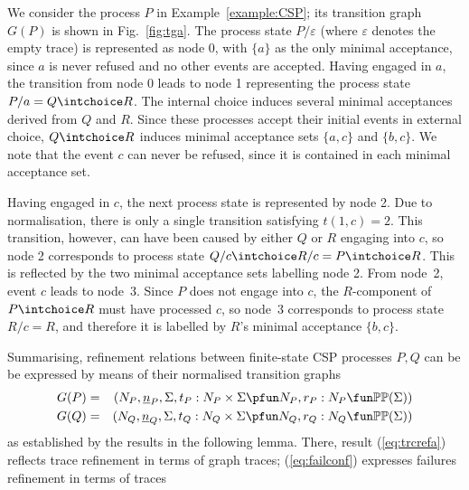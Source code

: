\begin{example}\label{ex:a}
We consider the process $P$ in Example~\ref{example:CSP}; its transition
graph $G(P)$ is shown in Fig.~\ref{fig:tga}. The process state
$P/\varepsilon$ (where $\varepsilon$ denotes the empty trace) is represented
as node 0, with $\{ a\}$ as the only minimal acceptance, since $a$ is never
refused and no other events are accepted. Having engaged in $a$, the
transition from node 0 leads to node 1 representing the process state $P/a
= Q\intchoice R$. The internal choice induces several minimal acceptances
derived from $Q$ and $R$. Since these processes accept their initial events
in external choice, $Q\intchoice R$ induces minimal acceptance sets $\{a,c\}$
and $\{b,c\}$. We note that the event $c$ can never be refused, since it is
contained in each minimal acceptance set.

Having engaged in $c$, the next process state is represented by node 2. Due
to normalisation, there is only a single transition satisfying
$t(1,c) = 2$. This transition, however, can have
been caused by either $Q$ or $R$ engaging into $c$, so node 2 corresponds to
process state $Q/c \intchoice R/c = P \intchoice R$. This is reflected by the
two minimal acceptance sets labelling node 2. 
From node~2, event $c$ leads to node~3. Since $P$ does not engage into $c$,
the $R$-component of $P\intchoice R$ must have processed $c$, so node~3 corresponds to process state $R/c = R$, and therefore it is labelled by $R$'s minimal acceptance
$\{b,c\}$. 
\xbox
\end{example}
%
Summarising, refinement relations between finite-state CSP processes $P, Q$ can be be
expressed by means of their normalised transition graphs
\begin{eqnarray*}
G(P) & = & ( N_P, {\ii n}_P, \Sigma, t_P : N_P\times\Sigma \pfun N_P, r_P : N_P \fun \mathbb{P}\mathbb{P}(\Sigma))
\\
G(Q) & = & ( N_Q, {\ii n}_Q, \Sigma, t_Q : N_Q\times\Sigma \pfun N_Q, r_Q : N_Q \fun \mathbb{P}\mathbb{P}(\Sigma))
\end{eqnarray*}
%
as established by the results  in the following lemma.
There, result (\ref{eq:trcrefa}) reflects trace refinement in terms of graph
traces; (\ref{eq:failconf}) expresses failures refinement in terms of traces
